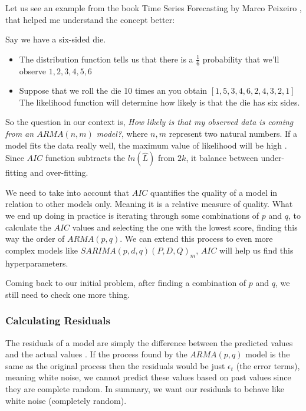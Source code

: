 \documentclass[journal]{IEEEtran}
\begin{document}
Let us see an example from the book Time Series Forecasting by Marco Peixeiro
\cite{timeseries}, that helped me understand the concept better:

Say we have a six-sided die.

\begin{itemize}
    \item
        The distribution function tells us that there is a $\frac{1}{6}$
        probability that we'll observe ${1,2,3,4,5,6}$
    \item
        Suppose that we roll the die 10 times an you obtain
        $[1,5,3,4,6,2,4,3,2,1]$ The likelihood function will determine how
        likely is that the die has six sides.
\end{itemize}

So the question in our context is, \emph{How likely is that my observed data is
coming from an $ARMA(n,m)$ model?}, where $n,m$ represent two natural numbers.
If a model fits the data really well, the maximum value of likelihood will be
high \cite{timeseries}. Since $AIC$ function subtracts the $ln(\hat{L})$ from
$2k$, it balance between under-fitting and over-fitting.

We need to take into account that $AIC$ quantifies the quality of a model in
relation to other models only. Meaning it is a relative measure of quality.
What we end up doing in practice is iterating through some combinations of $p$
and $q$, to calculate the $AIC$ values and selecting the one with the lowest
score, finding this way the order of $ARMA(p,q)$. We can extend this process
to even more complex models like $SARIMA(p,d,q)(P,D,Q)_m$, $AIC$ will help us
find this hyperparameters.

Coming back to our initial problem, after finding a combination of $p$ and $q$,
we still need to check one more thing.

\subsubsection{Calculating Residuals}\label{sub:resid}

The residuals of a model are simply the difference between the predicted
values and the actual values \cite{timeseries}.  If the process found by the
$ARMA(p,q)$ model is the same as the original process then the residuals would
be just $\epsilon_t$ (the error terms), meaning white noise, we cannot
predict these values based on past values since they are complete random. In
summary, we want our residuals to behave like white noise (completely random).
\end{document}
